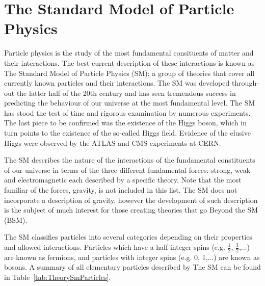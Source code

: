 \newcommand{\CommonElementTextFormat}[4]
{
  \begin{minipage}{3cm}
    \centering
      {\textbf{#1} \hfill #2}%
      \linebreak \linebreak
      {\textbf{#3}}%
      \linebreak \linebreak
      {{#4}}
  \end{minipage}
}

\newcommand{\NaturalElementTextFormat}[4]
{
  \CommonElementTextFormat{#1}{#2}{\LARGE {#3}}{#4}
}

\chapter{The Standard Model of Particle Physics} \label{sec:the_standard_model_of_particle_physics}
Particle physics is the study of the most fundamental consituents of matter and their interactions. The best current description of these interactions is known as The Standard Model of Particle Physics (SM); a group of theories that cover all currently known particles and their interactions. The SM was developed through-out the latter half of the 20th century and has seen tremendous success in predicting the behaviour of our universe at the most fundamental level. The SM has stood the test of time and rigorous examination by numerous experiments. The last piece to be confirmed was the existence of the Higgs boson, which in turn points to the existence of the so-called Higgs field. Evidence of the elusive Higgs were observed by the ATLAS and CMS experiments at CERN\cite{Theory:HiggsDiscoveryATLAS,Theory:HiggsDiscoveryCMS}.

The SM describes the nature of the interactions of the fundamental constituents of our universe in terms of the three different fundamental forces: strong, weak and electromagnetic each described by a specific theory. Note that the most familiar of the forces, gravity, is not included in this list. The SM does not incorporate a description of gravity, however the development of such description is the subject of much interest for those creating theories that go Beyond the SM (BSM).

The SM classifies particles into several categories depending on their properties and allowed interactions. Particles which have a half-integer spins (e.g. $\frac{1}{2}$, $\frac{3}{2}$,...) are known as fermions, and particles with integer spins (e.g. 0, 1,...) are known as bosons. A summary of all elementary particles described by The SM can be found in Table~\ref{tab:TheorySmParticles}.

